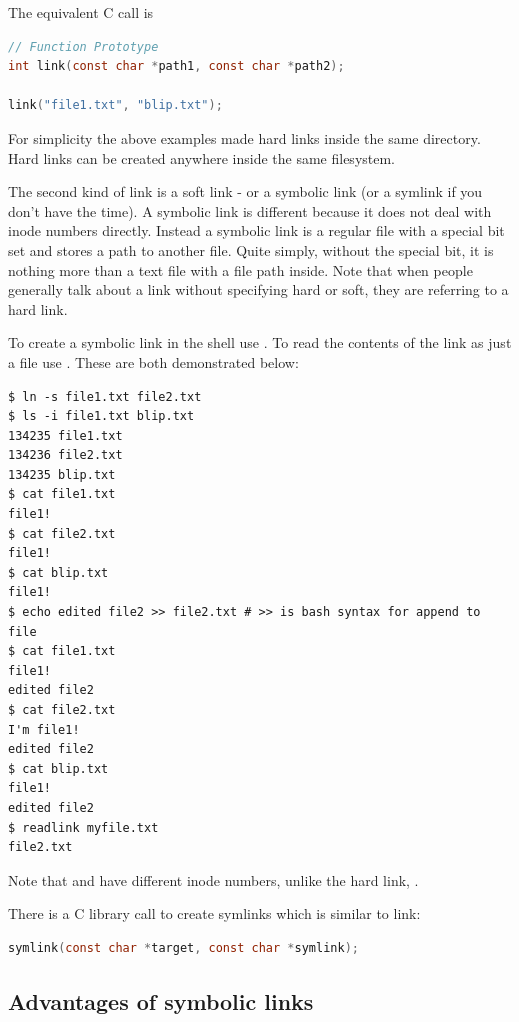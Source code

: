 The equivalent C call is 

\begin{lstlisting}[language=C]
// Function Prototype
int link(const char *path1, const char *path2);

link("file1.txt", "blip.txt");
\end{lstlisting}

For simplicity the above examples made hard links inside the same directory. Hard links can be created anywhere inside the same filesystem.

The second kind of link is a soft link - or a symbolic link (or a symlink if you don't have the time). A symbolic link is different because it does not deal with inode numbers directly. Instead a symbolic link is a regular file with a special bit set and stores a path to another file. Quite simply, without the special bit, it is nothing more than a text file with a file path inside. Note that when people generally talk about a link without specifying hard or soft, they are referring to a hard link.

To create a symbolic link in the shell use . To read the contents of the link as just a file use . These are both demonstrated below:

\begin{lstlisting}
$ ln -s file1.txt file2.txt
$ ls -i file1.txt blip.txt
134235 file1.txt
134236 file2.txt
134235 blip.txt
$ cat file1.txt
file1!
$ cat file2.txt
file1!
$ cat blip.txt
file1!
$ echo edited file2 >> file2.txt # >> is bash syntax for append to file
$ cat file1.txt
file1!
edited file2
$ cat file2.txt
I'm file1!
edited file2
$ cat blip.txt
file1!
edited file2
$ readlink myfile.txt
file2.txt
\end{lstlisting}

Note that  and  have different inode numbers, unlike the hard link, .

There is a C library call to create symlinks which is similar to link:

\begin{lstlisting}[language=C]
symlink(const char *target, const char *symlink);
\end{lstlisting}

\subsection{Advantages of symbolic links}\label{advantages-of-symbolic-links}

